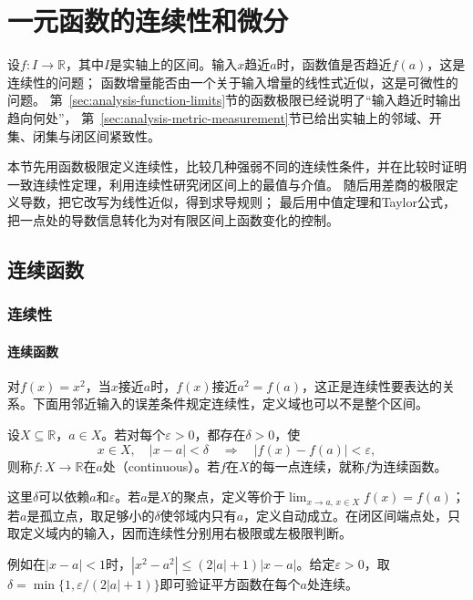 \section{一元函数的连续性和微分}
\label{sec:analysis-local-models}

设$f:I\to\mathbb R$，其中$I$是实轴上的区间。输入$x$趋近$a$时，函数值是否趋近$f(a)$，这是连续性的问题；
函数增量能否由一个关于输入增量的线性式近似，这是可微性的问题。
第~\ref{sec:analysis-function-limits}节的函数极限已经说明了“输入趋近时输出趋向何处”，
第~\ref{sec:analysis-metric-measurement}节已给出实轴上的邻域、开集、闭集与闭区间紧致性。

本节先用函数极限定义连续性，比较几种强弱不同的连续性条件，并在比较时证明一致连续性定理，利用连续性研究闭区间上的最值与介值。
随后用差商的极限定义导数，把它改写为线性近似，得到求导规则；
最后用中值定理和Taylor公式，把一点处的导数信息转化为对有限区间上函数变化的控制。

\subsection{连续函数}
\label{sec:analysis-metric-continuity-extrema}

\subsubsection{连续性}

\paragraph{连续函数}
对$f(x)=x^2$，当$x$接近$a$时，$f(x)$接近$a^2=f(a)$，这正是连续性要表达的关系。下面用邻近输入的误差条件规定连续性，定义域也可以不是整个区间。
\begin{definition}[连续函数]
\label{def:analysis-continuity}
设$X\subseteq\mathbb R$，$a\in X$。若对每个$\varepsilon>0$，都存在$\delta>0$，使
\[
 x\in X,\quad |x-a|<\delta
 \quad\Longrightarrow\quad |f(x)-f(a)|<\varepsilon,
\]
则称$f:X\to\mathbb R$在$a$处（continuous）。若$f$在$X$的每一点连续，就称$f$为连续函数。
\end{definition}
这里$\delta$可以依赖$a$和$\varepsilon$。若$a$是$X$的聚点，定义等价于$\lim_{x\to a,\,x\in X}f(x)=f(a)$；若$a$是孤立点，取足够小的$\delta$使邻域内只有$a$，定义自动成立。在闭区间端点处，只取定义域内的输入，因而连续性分别用右极限或左极限判断。

例如在$|x-a|<1$时，$|x^2-a^2|\leq(2|a|+1)|x-a|$。给定$\varepsilon>0$，取$\delta=\min\{1,\varepsilon/(2|a|+1)\}$即可验证平方函数在每个$a$处连续。

